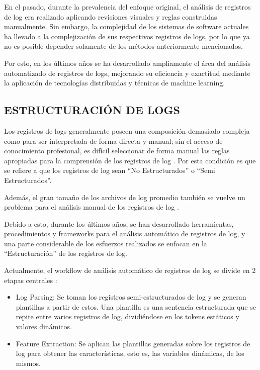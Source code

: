 En el pasado, durante la prevalencia del enfoque original, el análisis de registros de log era realizado aplicando revisiones visuales y reglas construidas manualmente. Sin embargo, la complejidad de los sistemas de software actuales ha llevado a la complejización de sus respectivos registros de logs, por lo que ya no es posible depender solamente de los métodos anteriormente mencionados. \cite{ma2023automatic}

Por esto, en los últimos años se ha desarrollado ampliamente el área del análisis automatizado de registros de logs, mejorando su eficiencia y exactitud mediante la aplicación de tecnologías distribuidas y técnicas de machine learning. \cite{ma2023automatic}

\subsection{ESTRUCTURACIÓN DE LOGS}
Los registros de logs generalmente poseen una composición demasiado compleja como para ser interpretada de forma directa y manual; sin el acceso de conocimiento profesional, es difícil seleccionar de forma manual las reglas apropiadas para la comprensión de los registros de log \cite{ma2023automatic}. Por esta condición es que se refiere a que los registros de log sean “No Estructurados” o “Semi Estructurados”. 

Además, el gran tamaño de los archivos de log promedio también se vuelve un problema para el análisis manual de los registros de log \cite{ma2023automatic}.

Debido a esto, durante los últimos años, se han desarrollado herramientas, procedimientos y frameworks para el análisis automático de registros de log, y una parte considerable de los esfuerzos realizados se enfocan en la “Estructuración” de los registros de log.

Actualmente, el workflow de análisis automático de registros de log se divide en 2 etapas centrales \cite{ma2023automatic}:

\begin{itemize}
    \item Log Parsing: Se toman los registros semi-estructurados de log y se generan plantillas a partir de estos. Una plantilla es una sentencia estructurada que se repite entre varios registros de log, dividiéndose en los tokens estáticos y valores dinámicos. \cite{ma2023automatic}

    \item Feature Extraction: Se aplican las plantillas generadas sobre los registros de log para obtener las características, esto es, las variables dinámicas, de los mismos. \cite{ma2023automatic}

\end{itemize}

